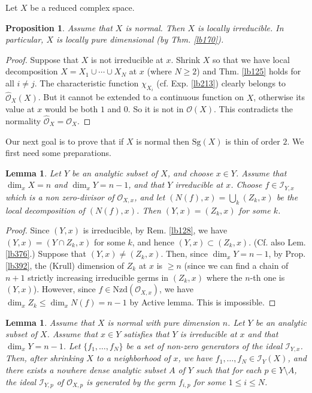 \documentclass[12pt,b5paper,notitlepage]{report}
\theoremstyle{definition}
\theoremstyle{plain}
\newtheorem{pp}[df]{Proposition}
\newtheorem{lm}[df]{Lemma}
\newcommand{\scr}{\mathscr}
\newcommand{\Sg}{\mathrm{Sg}}
\newcommand{\Nzd}{\mathrm{Nzd}}
\newcommand{\Owht}{\widehat{\scr O}}
\numberwithin{equation}{section}
\begin{document}
Let $X$ be a reduced complex space.


\begin{pp}\label{lb245}
Assume that $X$ is normal. Then $X$ is locally irreducible. In particular, $X$ is locally pure dimensional (by Thm. \ref{lb170}).
\end{pp}


\begin{proof}
Suppose that $X$ is not irreducible at $x$. Shrink $X$ so that we have local decomposition $X=X_1\cup\cdots\cup X_N$ at $x$ (where $N\geq 2$) and Thm. \ref{lb125} holds for all $i\neq j$. The characteristic function $\chi_{X_i}$ (cf. Exp. \ref{lb213}) clearly belongs to $\Owht_X(X)$. But it cannot be extended to a continuous function on $X$, otherwise its value at $x$ would be both $1$ and $0$. So it is not in $\scr O(X)$. This contradicts the normality $\Owht_X=\scr O_X$.
\end{proof}

Our next goal is to prove that if $X$ is normal then $\Sg(X)$ is thin of order $2$. We first need some preparations.

\begin{lm}\label{lb361}
Let $Y$ be an analytic subset of $X$, and choose $x\in Y$. Assume that $\dim_xX=n$ and $\dim_x Y=n-1$, and that $Y$ irreducible at $x$. Choose $f\in\scr I_{Y,x}$ which is a non zero-divisor of $\scr O_{X,x}$, and let $(N(f),x)=\bigcup_k (Z_k,x)$ be the local decomposition  of $(N(f),x)$. Then $(Y,x)=(Z_k,x)$ for some $k$.
\end{lm}


\begin{proof}
Since $(Y,x)$ is irreducible, by Rem. \ref{lb128}, we have $(Y,x)=(Y\cap Z_k,x)$ for some $k$, and hence $(Y,x)\subset (Z_k,x)$. (Cf. also Lem. \ref{lb376}.) Suppose that $(Y,x)\neq (Z_k,x)$. Then, since $\dim_xY=n-1$, by Prop. \ref{lb392}, the (Krull) dimension of $Z_k$ at $x$ is $\geq n$ (since we can find a chain of $n+1$ strictly increasing irreducible germs in $(Z_k,x)$ where the $n$-th one is $(Y,x)$). However, since $f\in\Nzd(\scr O_{X,x})$, we have $\dim_x Z_k\leq\dim_x N(f)=n-1$ by Active lemma. This is impossible. 
\end{proof}


\begin{lm}\label{lb363}
Assume that $X$ is normal with pure dimension $n$. Let $Y$ be an analytic subset of $X$. Assume that $x\in 
Y$ satisfies that $Y$ is irreducible at $x$ and that $\dim_xY=n-1$. Let $\{f_1,\dots,f_N\}$ be a set of non-zero generators of the ideal $\scr I_{Y,x}$. Then, after shrinking $X$ to a neighborhood of $x$, we have $f_1,\dots,f_N\in\scr I_Y(X)$, and there exists a nowhere dense analytic subset $A$ of $Y$ such that for each $p\in Y\setminus A$, the ideal $\scr I_{Y,p}$  of $\scr O_{X,p}$ is generated by the germ $f_{i,p}$ for some $1\leq i\leq N$.
\end{lm}
\end{document}

